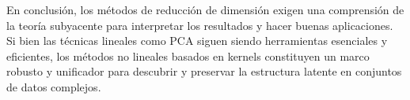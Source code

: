 \documentclass{article}
\numberwithin{equation}{section}
\theoremstyle{remark}
\theoremstyle{definition}
\theoremstyle{remark}
\theoremstyle{remark}
\begin{document}
En conclusión, los métodos de reducción de dimensión exigen una comprensión de la teoría subyacente para interpretar los resultados y hacer buenas aplicaciones.
Si bien las técnicas lineales como PCA siguen siendo herramientas esenciales y eficientes, los métodos no lineales basados en kernels constituyen un marco 
robusto y unificador para descubrir y preservar la estructura latente en conjuntos de datos complejos.

\pagebreak
\printbibliography
\end{document}
